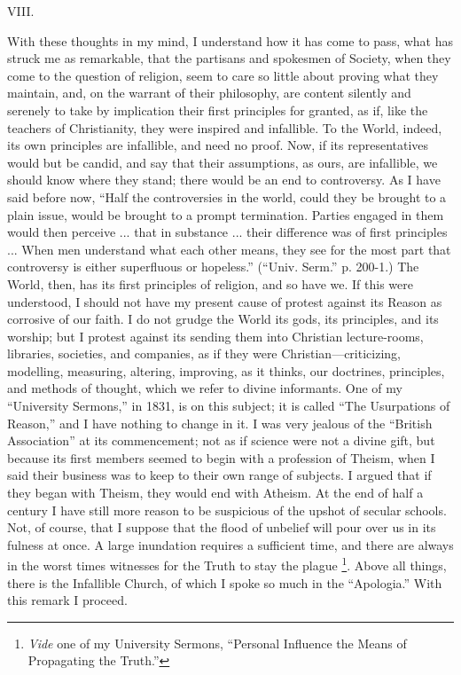 VIII.

With these thoughts in my mind, I understand how it has come to
pass, what has struck me as remarkable, that the partisans and
spokesmen of Society, when they come to the question of religion, seem
to care so little about proving what they maintain, and, on the
warrant of their philosophy, are content silently and serenely to take
by implication their first principles for granted, as if, like the
teachers of Christianity, they were inspired and infallible. To the
World, indeed, its own principles are infallible, and need no proof.
Now, if its representatives would but be candid, and say that their
assumptions, as ours, are infallible, we should know where they stand;
there would be an end to controversy. As I have said before now,
``Half the controversies in the world, could they be brought to a
plain issue, would be brought to a prompt termination. Parties engaged
in them would then perceive ... that in substance ... their difference
was of first principles ... When men understand what each other means,
they see for the most part that controversy is either superfluous or
hopeless.'' (``Univ. Serm.'' p. 200-1.) The World, then,
has its first principles of religion, and so have we. If this were
understood, I should not have my present cause of protest against its
Reason as corrosive of our faith. I do not grudge the World its gods,
its principles, and its worship; but I protest against its sending
them into Christian lecture-rooms, libraries, societies, and
companies, as if they were Christian—criticizing, modelling,
measuring, altering, improving, as it thinks, our doctrines,
principles, and methods of thought, which we refer to divine
informants. One of my ``University Sermons,'' in 1831, is on
this subject; it is called ``The Usurpations of Reason,'' and
I have nothing to change in it. I was very jealous of the
``British Association'' at its commencement; not as if science
were not a divine gift, but because its first members seemed to begin
with a profession of Theism, when I said their business was to keep to
their own range of subjects. I argued that if they began with Theism,
they would end with Atheism. At the end of half a century I have still
more reason to be suspicious of the upshot of secular schools. Not, of
course, that I suppose that the flood of unbelief will pour over us in
its fulness at once. A large inundation requires a sufficient time,
and there are always in the worst times witnesses for the Truth to
stay the plague \footnote{\emph{Vide} one
of my University Sermons, ``Personal Influence the Means of
Propagating the Truth.''}. Above
all things, there is the Infallible Church, of which I spoke so much
in the ``Apologia.'' With this remark I proceed.

